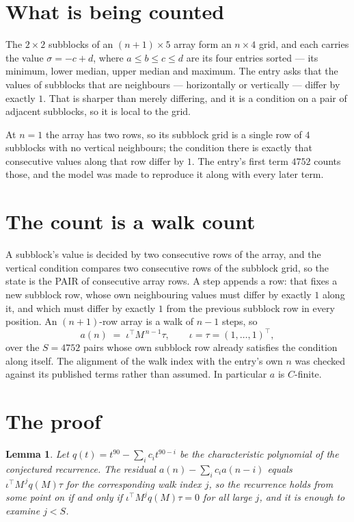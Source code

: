 \documentclass[11pt,a4paper]{article}
\theoremstyle{plain}
\newtheorem{lemma}[theorem]{Lemma}
\theoremstyle{definition}
\begin{document}
\section{What is being counted}

The $2\times2$ subblocks of an $(n+1)\times5$ array form an
$n\times4$ grid, and each carries the value $\sigma=-c+d$, where $a\le b\le c\le d$ are its four entries sorted --- its minimum, lower median, upper median and maximum. The entry asks that the values of
subblocks that are neighbours --- horizontally or vertically --- differ by exactly $1$.
That is sharper than merely differing, and it is a condition on a pair of adjacent subblocks,
so it is local to the grid.

At $n=1$ the array has two rows, so its subblock grid is a single row of $4$ subblocks with
no vertical neighbours; the condition there is exactly that consecutive values along that row
differ by $1$. The entry's first term $4752$ counts those, and the model was made to
reproduce it along with every later term.

\section{The count is a walk count}

A subblock's value is decided by two consecutive rows of the array, and the
vertical condition compares two consecutive rows of the subblock grid, so the state is the
PAIR of consecutive array rows. A step appends a row: that fixes a new subblock row, whose own
neighbouring values must differ by exactly $1$ along it, and which must differ by exactly
$1$ from the previous subblock row in every position. An $(n+1)$-row array is a walk of
$n-1$ steps, so
\[
a(n)\;=\;\iota^{\!\top}M^{\,n-1}\tau,\qquad\iota=\tau=(1,\dots,1)^{\!\top},
\]
over the $S=4752$ pairs whose own subblock row already satisfies the condition along itself.
The alignment of the walk index with the entry's own $n$ was checked against its published
terms rather than assumed. In particular $a$ is $C$-finite.

\section{The proof}

\begin{lemma}\label{lem:crit}
Let $q(t)=t^{90}-\sum_i c_it^{90-i}$ be the characteristic polynomial of the
conjectured recurrence. The residual $a(n)-\sum_ic_ia(n-i)$ equals
$\iota^{\!\top}M^{\,j}q(M)\tau$ for the corresponding walk index $j$, so the recurrence
holds from some point on if and only if $\iota^{\!\top}M^{j}q(M)\tau=0$ for all large $j$,
and it is enough to examine $j<S$.
\end{lemma}
\end{document}

